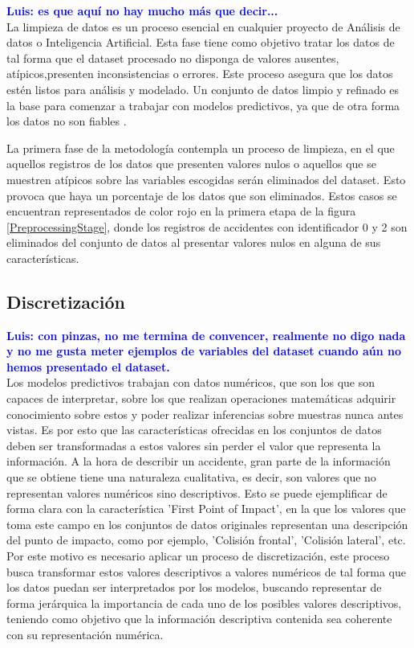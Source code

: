\documentclass{uathesis-es}
\begin{document}
\textcolor{blue}{\textbf{Luis: es que aquí no hay mucho más que decir...}}\\

La limpieza de datos es un proceso esencial en cualquier proyecto de Análisis de datos o Inteligencia Artificial. Esta fase tiene como objetivo tratar los datos de tal forma que el dataset procesado no disponga de valores ausentes, atípicos,presenten inconsistencias o errores. Este proceso asegura que los datos estén listos para análisis y modelado. Un conjunto de datos limpio y refinado es la base para comenzar a trabajar con modelos predictivos, ya que de otra forma los datos no son fiables \cite{ilyas2019data}.


La primera fase de la metodología contempla un proceso de limpieza, en el que aquellos registros de los datos que presenten valores nulos o aquellos que se muestren atípicos sobre las variables escogidas serán eliminados del dataset. Esto provoca que haya un porcentaje de los datos que son eliminados. Estos casos se encuentran representados de color rojo en la primera etapa de la figura \ref{PreprocessingStage}, donde los registros de accidentes con identificador 0 y 2 son eliminados del conjunto de datos al presentar valores nulos en alguna de sus características.

\subsection{Discretización}


\textcolor{blue}{\textbf{Luis: con pinzas, no me termina de convencer, realmente no digo nada y no me gusta meter ejemplos de variables del dataset cuando aún no hemos presentado el dataset.}}\\

Los modelos predictivos trabajan con datos numéricos, que son los que son capaces de interpretar, sobre los que realizan operaciones matemáticas adquirir conocimiento sobre estos y poder realizar inferencias sobre muestras nunca antes vistas. Es por esto que las características ofrecidas en los conjuntos de datos deben ser transformadas a estos valores sin perder el valor que representa la información. A la hora de describir un accidente, gran parte de la información que se obtiene tiene una naturaleza cualitativa, es decir, son valores que no representan valores numéricos sino descriptivos. Esto se puede ejemplificar de forma clara con la característica 'First Point of Impact', en la que los valores que toma este campo en los conjuntos de datos originales representan una descripción del punto de impacto, como por ejemplo,  'Colisión frontal', 'Colisión lateral', etc. Por este motivo es necesario aplicar un proceso de discretización, este proceso busca transformar estos valores descriptivos a valores numéricos de tal forma que los datos puedan ser interpretados por los modelos, buscando representar de forma jerárquica la importancia de cada uno de los posibles valores descriptivos, teniendo como objetivo que la información descriptiva contenida sea coherente con su representación numérica.
\end{document}
